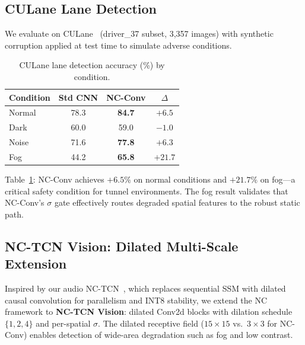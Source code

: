 \documentclass[runningheads]{llncs}
\begin{document}
\subsection{CULane Lane Detection}
\label{sec:culane}

We evaluate on CULane~\cite{pan2018culane} (driver\_37 subset, 3,357 images) with synthetic corruption applied at test time to simulate adverse conditions.

\begin{table}[t]
\centering
\caption{CULane lane detection accuracy (\%) by condition.}
\label{tab:culane}
\small
\begin{tabular}{@{}lccc@{}}
\toprule
\textbf{Condition} & \textbf{Std CNN} & \textbf{NC-Conv} & $\Delta$ \\
\midrule
Normal  & 78.3 & \textbf{84.7} & $+6.5$ \\
Dark    & 60.0 & 59.0 & $-1.0$ \\
Noise   & 71.6 & \textbf{77.8} & $+6.3$ \\
Fog     & 44.2 & \textbf{65.8} & $\mathbf{+21.7}$ \\
\bottomrule
\end{tabular}
\end{table}

Table~\ref{tab:culane}: NC-Conv achieves $+6.5\%$ on normal conditions and $\mathbf{+21.7\%}$ on fog---a critical safety condition for tunnel environments.
The fog result validates that NC-Conv's $\sigma$ gate effectively routes degraded spatial features to the robust static path.


\subsection{NC-TCN Vision: Dilated Multi-Scale Extension}
\label{sec:nctcn_exp}

Inspired by our audio NC-TCN~\cite{choi2026ncssm}, which replaces sequential SSM with dilated causal convolution for parallelism and INT8 stability, we extend the NC framework to \textbf{NC-TCN Vision}: dilated Conv2d blocks with dilation schedule $\{1, 2, 4\}$ and per-spatial $\sigma$.
The dilated receptive field ($15{\times}15$ vs.\ $3{\times}3$ for NC-Conv) enables detection of wide-area degradation such as fog and low contrast.
\end{document}
